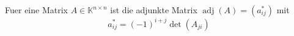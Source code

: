 Fuer eine Matrix $A \in \mathbb{K}^{n \times n}$ ist die adjunkte Matrix $\operatorname{adj}(A) = (a_{ij}^{*})$ mit 
$$a_{ij}^{*} = (-1)^{i+j} \det(A_{ji})$$ 
